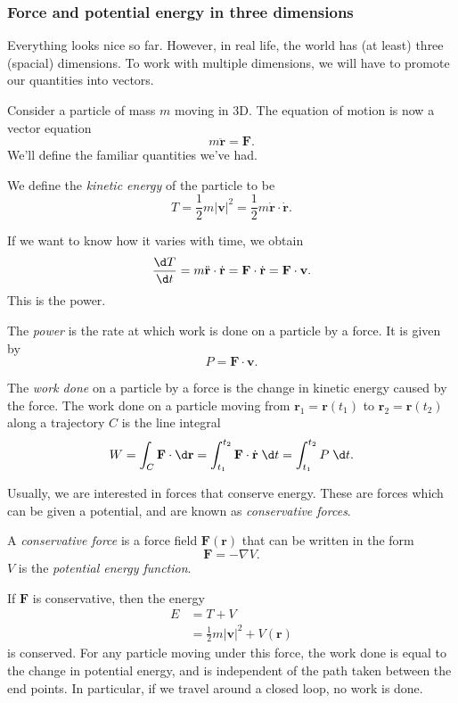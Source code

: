 \documentclass[a4paper]{article}
\begin{document}
\subsubsection*{Force and potential energy in three dimensions}
Everything looks nice so far. However, in real life, the world has (at least) three (spacial) dimensions. To work with multiple dimensions, we will have to promote our quantities into vectors.

Consider a particle of mass $m$ moving in 3D. The equation of motion is now a vector equation
\[
  m\ddot{\mathbf{r}} = \mathbf{F}.
\]
We'll define the familiar quantities we've had.
\begin{defi}
  We define the \emph{kinetic energy} of the particle to be
  \[
    T = \frac{1}{2}m|\mathbf{v}|^2 = \frac{1}{2}m\dot{\mathbf{r}}\cdot \dot{\mathbf{r}}.
  \]
\end{defi}
If we want to know how it varies with time, we obtain
\[
  \frac{\d T}{\d t} = m\ddot{\mathbf{r}}\cdot \dot{\mathbf{r}} = \mathbf{F}\cdot \dot{\mathbf{r}} = \mathbf{F}\cdot \mathbf{v}.
\]
This is the power.
\begin{defi}[Power]
  The \emph{power} is the rate at which work is done on a particle by a force. It is given by
  \[
    P = \mathbf{F}\cdot \mathbf{v}.
  \]
\end{defi}
\begin{defi}
  The \emph{work done} on a particle by a force is the change in kinetic energy caused by the force. The work done on a particle moving from $\mathbf{r}_1 = \mathbf{r}(t_1)$ to $\mathbf{r}_2 = \mathbf{r}(t_2)$ along a trajectory $C$ is the line integral
  \[
    W = \int_C \mathbf{F}\cdot\d \mathbf{r} = \int_{t_1}^{t_2} \mathbf{F}\cdot \dot{\mathbf{r}}\;\d t = \int_{t_1}^{t_2} P \;\d t.
  \]
\end{defi}
Usually, we are interested in forces that conserve energy. These are forces which can be given a potential, and are known as \emph{conservative forces}.
\begin{defi}
  A \emph{conservative force} is a force field $\mathbf{F}(\mathbf{r})$ that can be written in the form
  \[
    \mathbf{F} = -\nabla V.
  \]
  $V$ is the \emph{potential energy function}.
\end{defi}

\begin{prop}
  If $\mathbf{F}$ is conservative, then the energy
  \begin{align*}
    E &= T + V\\
    &= \frac{1}{2}m|\mathbf{v}|^2 + V(\mathbf{r})
  \end{align*}
  is conserved. For any particle moving under this force, the work done is equal to the change in potential energy, and is independent of the path taken between the end points. In particular, if we travel around a closed loop, no work is done.
\end{prop}
\end{document}
